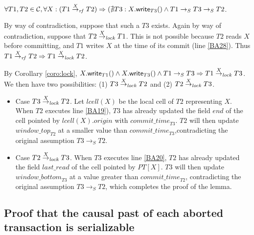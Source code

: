 \begin{lemma}
\label{lemma:legal}
$\forall T1, T2 \in \mathcal{C}, \forall X: (T1 \stackrel{X}{\rightarrow}_{\mathit{rf}} T2)
\Rightarrow 
(\nexists T3: X.{\sf write}_{T3}() \wedge T1 
                           \rightarrow_S T3 \rightarrow_S T2$.
\end{lemma}
\begin{proofL}
By way of contradiction, suppose that such a $T3$ exists.
Again by way of contradiction, suppose that $T2 \stackrel{X}{\rightarrow}_{\mathit{lock}} T1$. 
This is not possible
because $T2$ reads $X$ before committing, and $T1$ writes $X$ at 
the time of its commit
(line \ref{BA28}). Thus $T1 \stackrel{X}{\rightarrow}_{\mathit{rf}} T2 \Rightarrow T1 \stackrel{X}{\rightarrow}_{\mathit{lock}} T2$.

By Corollary \ref{coro:lock},
$X.{\sf write}_{T1}() \wedge X.{\sf write}_{T3}() \wedge T1 \rightarrow_S T3 
\Rightarrow T1 \stackrel{X}{\rightarrow}_{\mathit{lock}} T3$.
We then have two possibilities: (1) $T3 \stackrel{X}{\rightarrow}_{\mathit{lock}} T2$ and (2) 
$T2 \stackrel{X}{\rightarrow}_{\mathit{lock}} T3$.

\begin{itemize}
\vspace{-0.2cm}
\item
Case  $T3 \stackrel{X}{\rightarrow}_{\mathit{lock}} T2$. 
Let $lcell(X)$ be the local cell of $T2$ representing $X$.
When $T2$ executes line \ref{BA19}), $T3$ has already updated 
the field $end$ of the cell pointed by $lcell(X).\mathit{origin}$
with $\mathit{commit\_time}_{T3}$.
$T2$ will then update $\mathit{window\_top}_{T2}$ at a  smaller value
than $\mathit{commit\_time}_{T3}$,contradicting the original assumption  
$T3 \rightarrow_S T2$.
\vspace{-0.2cm}
\item
Case $T2 \stackrel{X}{\rightarrow}_{\mathit{lock}} T3$.
When $T3$ executes line \ref{BA20}, $T2$ has already updated the field 
$\mathit{last\_read}$ of the cell pointed by $PT[X]$.
$T3$ will then update 
$\mathit{window\_bottom}_{T3}$ at a value greater than 
$\mathit{commit\_time}_{T2}$, contradicting the original assumption 
$T3 \rightarrow_S T2$, which completes the proof of the lemma.
\end{itemize}
\renewcommand{\toto}{lemma:legal}
\end{proofL}

\subsection{Proof that the causal past of each aborted transaction 
is serializable}

